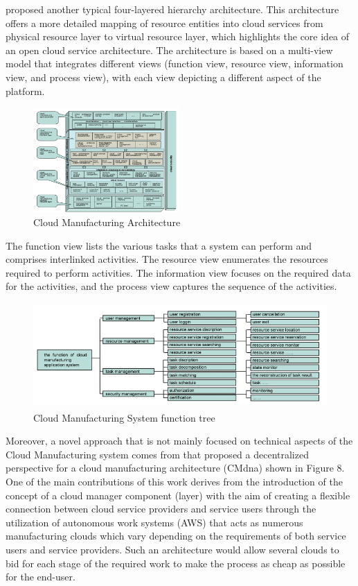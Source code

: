\textcite{lv_multi-view_2012} proposed another typical four-layered hierarchy architecture. This architecture offers a more detailed mapping of resource entities into cloud services from physical resource layer to virtual resource layer, which highlights the core idea of an open cloud service architecture. The architecture is based on a multi-view model that integrates different views (function view, resource view, information view, and process view), with each view depicting a different aspect of the platform.


\begin{figure}[h]
    \centering
    \includegraphics[height=4cm, keepaspectratio]{images/lv-cmfg-architecture}
    \caption{\textcite{lv_multi-view_2012} Cloud Manufacturing Architecture}
    \label{fig:lv-cmfg-architecture}
\end{figure}

The function view lists the various tasks that a system can perform and comprises interlinked activities. The resource view enumerates the resources required to perform activities. The information view focuses on the required data for the activities, and the process view captures the sequence of the activities.

\begin{figure}[h]
    \centering
    \includegraphics[height=4cm, keepaspectratio]{images/lv-cmfg-function-tree}
    \caption{\textcite{lv_multi-view_2012} Cloud Manufacturing System function tree}
    \label{fig:lv-cmfg-function-tree}
\end{figure}


Moreover, a novel approach that is not mainly focused on technical aspects of the Cloud Manufacturing system comes from \textcite{skulj_decentralised_2015} that proposed a decentralized perspective for a cloud manufacturing architecture (CMdna) shown in Figure 8. One of the main contributions of this work derives from the introduction of the concept of a cloud manager component (layer) with the aim of creating a flexible connection between cloud service providers and service users through the utilization of autonomous work systems (AWS) that acts as numerous manufacturing clouds which vary depending on the requirements of both service users and service providers. Such an architecture would allow several clouds to bid for each stage of the required work to make the process as cheap as possible for the end-user.

